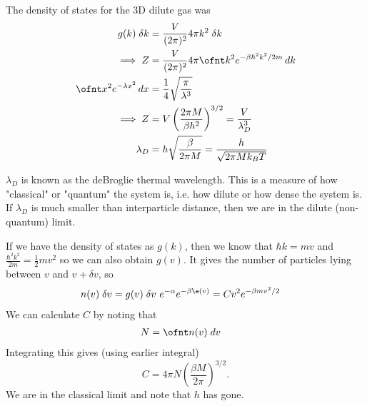 \documentclass[a4paper, 11pt, normalem]{report}
\begin{document}
\begin{example}
    The density of states for the 3D dilute gas was
    \begin{align}
        g(k)\;\delta k &= \frac{V}{(2\pi)^2}4\pi k^2\;\delta k \\
        \implies Z &= \frac{V}{(2\pi)^2}4\pi \ofnt k^2e^{-\beta\hbar^2k^2/2m}\,dk \\
        \ofnt x^2e^{-\lambda x^2}\,dx &= \frac{1}{4}\sqrt{\frac{\pi}{\lambda^3}} \\
        \implies Z &= V\left(\frac{2\pi M}{\beta h^2}\right)^{3/2} = \frac{V}{\lambda_D^3} \\
        \lambda_D &= h\sqrt{\frac{\beta}{2\pi M}} = \frac{h}{\sqrt{2\pi Mk_BT}}
    \end{align}
\end{example}
$\lambda_D$ is known as the deBroglie thermal wavelength. 
This is a measure of how "classical" or "quantum" the system is, i.e. how dilute or how dense the system is. 
If $\lambda_D$ is much smaller than interparticle distance, then we are in the dilute (non-quantum) limit.

If we have the density of states as $g(k)$, then we know that $\hbar k = mv$ and $\frac{\hbar^2k^2}{2m} = \frac{1}{2}mv^2$ so we can also obtain $g(v)$.
It gives the number of particles lying between $v$ and $v+\delta v$, so
\begin{align}
    n(v)\;\delta v &= g(v)\;\delta v ~e^{-\alpha}e^{-\beta\e(v)} = Cv^2e^{-\beta mv^2/2}
\end{align}
We can calculate $C$ by noting that 
\begin{align}
    N &= \ofnt n(v)\;dv
\end{align}
Integrating this gives (using earlier integral)
\begin{equation}
    C = 4\pi N\left(\frac{\beta M}{2\pi}\right)^{3/2}.
\end{equation}
We are in the classical limit and note that $h$ has gone. 
\end{document}
